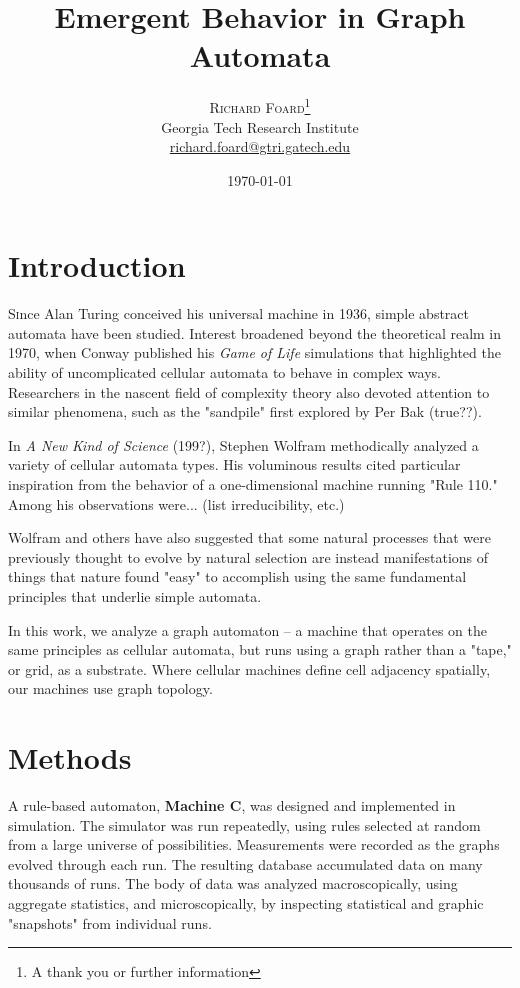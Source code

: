 \documentclass[twoside,twocolumn]{article}
\title{Emergent Behavior in Graph Automata} %
\author{%
\textsc{Richard Foard}\thanks{A thank you or further information} \\[1ex] %
\normalsize Georgia Tech Research Institute \\ %
\normalsize \href{mailto:richard.foard@gtri.gatech.edu}{richard.foard@gtri.gatech.edu} %
}
\date{\today} %
\begin{document}
\maketitle


\section{Introduction}

\lettrine[nindent=0em,lines=3]{S} ince Alan Turing conceived his
universal machine in 1936, simple abstract automata have been studied. Interest broadened
beyond the theoretical realm in 1970,
when Conway published his \textit{Game of Life} simulations that highlighted the ability
of uncomplicated cellular automata to behave in complex ways. Researchers in the
nascent field of complexity theory also devoted attention to similar phenomena, such as the
"sandpile" first explored by Per Bak (true??).

In \textit{A New Kind of Science} (199?), Stephen Wolfram methodically analyzed
a variety of cellular automata types. His voluminous results cited particular inspiration from the
behavior of a one-dimensional machine running "Rule 110." Among his observations were... (list
irreducibility, etc.)

Wolfram and others have also suggested that some natural processes that were
previously thought to evolve by natural selection are instead
manifestations of things that nature found "easy" to accomplish using
the same fundamental principles that underlie simple automata.

In this work, we analyze a graph automaton -- a machine that operates on the same principles as
cellular automata, but runs using a graph rather than a "tape," or grid, as a substrate.
Where cellular machines define cell adjacency spatially, our machines use graph topology.


\section{Methods}

A rule-based automaton, \textbf{Machine C}, was designed and implemented in simulation.
The simulator was run repeatedly, using rules
selected at random from a large universe of possibilities. Measurements were recorded as the graphs
evolved through each run. The resulting database accumulated data on many thousands of runs. The body of data
was analyzed macroscopically, using aggregate
statistics, and microscopically, by inspecting statistical and graphic "snapshots" from individual runs.
\end{document}
